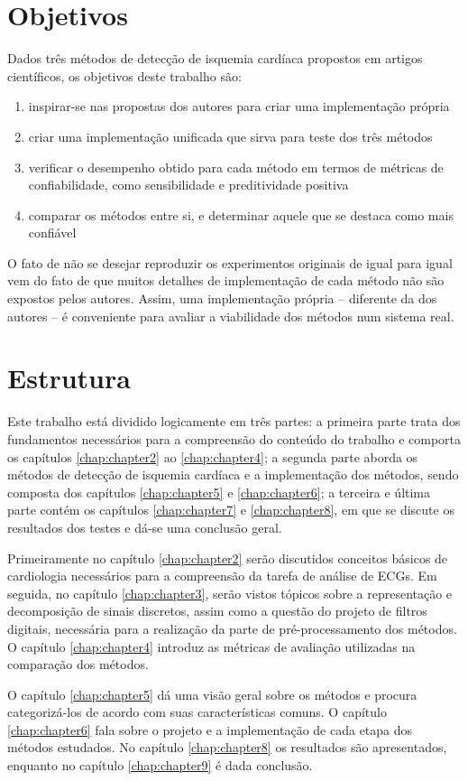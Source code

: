 \section{Objetivos}
Dados três métodos de detecção de isquemia cardíaca propostos em artigos científicos, os objetivos deste trabalho são:
\begin{enumerate}
    \item inspirar-se nas propostas dos autores para criar uma implementação própria
    \item criar uma implementação unificada que sirva para teste dos três métodos
    \item verificar o desempenho obtido para cada método em termos de métricas de confiabilidade, como sensibilidade e preditividade positiva
    \item comparar os métodos entre si, e determinar aquele que se destaca como mais confiável
\end{enumerate}

O fato de não se desejar reproduzir os experimentos originais de igual para igual vem do fato de que muitos detalhes de implementação de cada método não são expostos pelos autores. Assim, uma implementação própria -- diferente da dos autores -- é conveniente para avaliar a viabilidade dos métodos num sistema real.

\section{Estrutura}
Este trabalho está dividido logicamente em três partes: a primeira parte trata dos fundamentos necessários para a compreensão do conteúdo do trabalho e comporta os capítulos \ref{chap:chapter2} ao \ref{chap:chapter4}; a segunda parte aborda os métodos de detecção de isquemia cardíaca e a implementação dos métodos, sendo composta dos capítulos \ref{chap:chapter5} e \ref{chap:chapter6}; a terceira e última parte contém os capítulos \ref{chap:chapter7} e \ref{chap:chapter8}, em que se discute os resultados dos testes e dá-se uma conclusão geral.

Primeiramente no capítulo \ref{chap:chapter2} serão discutidos conceitos básicos de cardiologia necessários para a compreensão da tarefa de análise de ECGs. Em seguida, no capítulo \ref{chap:chapter3}, serão vistos tópicos sobre a representação e decomposição de sinais discretos, assim como a questão do projeto de filtros digitais, necessária para a realização da parte de pré-processamento dos métodos. O capítulo \ref{chap:chapter4} introduz as métricas de avaliação utilizadas na comparação dos métodos.

O capítulo \ref{chap:chapter5} dá uma visão geral sobre os métodos e procura categorizá-los de acordo com suas características comuns. O capítulo \ref{chap:chapter6} fala sobre o projeto e a implementação de cada etapa dos métodos estudados. No capítulo \ref{chap:chapter8} os resultados são apresentados, enquanto no capítulo \ref{chap:chapter9} é dada conclusão.